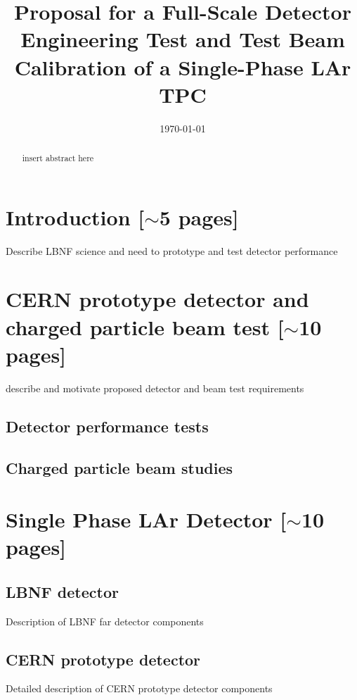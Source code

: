 \documentclass[12pt]{article}
\begin{document}
\title{  Proposal for a Full-Scale Detector Engineering Test and Test Beam Calibration of a Single-Phase LAr TPC}


\date{\today}


\maketitle



\begin{abstract}

insert abstract here

\end{abstract}

\newpage
\tableofcontents

\newpage

\section{Introduction [$\sim$5 pages]}
Describe LBNF science and need to prototype and test detector performance

\section{CERN prototype detector and charged particle beam test [$\sim$10 pages]}
describe and motivate proposed detector and beam test requirements 
	\subsection{Detector performance tests}

	\subsection{Charged particle beam studies}
	

\section{Single Phase LAr Detector [$\sim$10 pages]}

	\subsection{LBNF detector}
	Description of LBNF far detector components

	\subsection{CERN prototype detector}
	Detailed description of CERN prototype detector components
\end{document}
